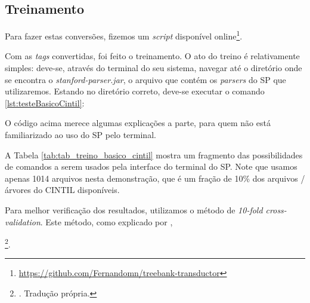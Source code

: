 \begin{center}
    
\end{center}

\subsection{Treinamento}
\label{subsec:treinamento_cintil}

Para fazer estas conversões, fizemos um \textit{script} disponível online\footnote{\url{ https://github.com/Fernandomn/treebank-transductor}}.

Com as \textit{tags} convertidas, foi feito o treinamento. O ato do treino é relativamente simples: deve-se, através do terminal do seu sistema, navegar até o diretório onde se encontra o \textit{stanford-parser.jar}, o arquivo que contém os \textit{parsers} do SP que utilizaremos. Estando no diretório correto, deve-se executar o comando \ref{lst:testeBasicoCintil}:

\begin{center}

\end{center}

O código acima merece algumas explicações a parte, para quem não está familiarizado ao uso do SP pelo terminal.

\begin{center}

\end{center}

A Tabela \ref{tab:tab_treino_basico_cintil} mostra um fragmento das possibilidades de comandos a serem usados pela interface do terminal do SP. Note que usamos apenas 1014 arquivos nesta demonstração, que é um fração de 10\% dos arquivos / árvores do CINTIL disponíveis.

Para melhor verificação dos resultados, utilizamos o método de \textit{10-fold cross-validation}. Este método, como explicado por ,
\begin{displayquote}
    \footnote{. Tradução própria.}.
\end{displayquote}

